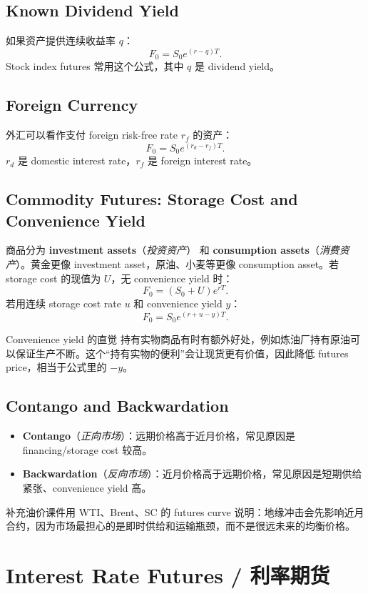 \documentclass[11pt,a4paper,openany]{ctexbook}
\newcommand{\term}[2]{\textbf{#1}（\emph{#2}）}
\newcommand{\source}[1]{\par\smallskip\noindent{\small\textcolor{muted}{Source: #1}}\par}
\begin{document}
\section{Known Dividend Yield}
如果资产提供连续收益率 $q$：
\[
F_0=S_0e^{(r-q)T}.
\]
Stock index futures 常用这个公式，其中 $q$ 是 dividend yield。

\section{Foreign Currency}
外汇可以看作支付 foreign risk-free rate $r_f$ 的资产：
\[
F_0=S_0e^{(r_d-r_f)T}.
\]
$r_d$ 是 domestic interest rate，$r_f$ 是 foreign interest rate。

\section{Commodity Futures: Storage Cost and Convenience Yield}
商品分为 \term{investment assets}{投资资产} 和 \term{consumption assets}{消费资产}。黄金更像 investment asset，原油、小麦等更像 consumption asset。若 storage cost 的现值为 $U$，无 convenience yield 时：
\[
F_0=(S_0+U)e^{rT}.
\]
若用连续 storage cost rate $u$ 和 convenience yield $y$：
\[
F_0=S_0e^{(r+u-y)T}.
\]

\begin{intuitionbox}{Convenience yield 的直觉}
持有实物商品有时有额外好处，例如炼油厂持有原油可以保证生产不断。这个“持有实物的便利”会让现货更有价值，因此降低 futures price，相当于公式里的 $-y$。
\end{intuitionbox}

\section{Contango and Backwardation}
\begin{itemize}
  \item \term{Contango}{正向市场}：远期价格高于近月价格，常见原因是 financing/storage cost 较高。
  \item \term{Backwardation}{反向市场}：近月价格高于远期价格，常见原因是短期供给紧张、convenience yield 高。
\end{itemize}
补充油价课件用 WTI、Brent、SC 的 futures curve 说明：地缘冲击会先影响近月合约，因为市场最担心的是即时供给和运输瓶颈，而不是很远未来的均衡价格。

\chapter{Interest Rate Futures / 利率期货}
\source{Lecture 6; Lecture 7; Assignment 2}
\end{document}
